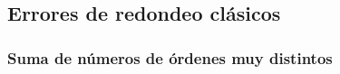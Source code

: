






\subsection{Errores de redondeo clásicos}

\subsubsection{Suma de números de órdenes muy distintos}


